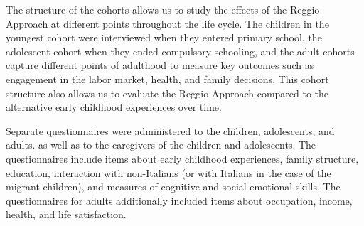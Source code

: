 %	

The structure of the cohorts allows us to study the effects of the Reggio Approach at different points throughout the life cycle. The children in the youngest cohort were interviewed when they entered primary school, the adolescent cohort when they ended compulsory schooling, and the adult cohorts capture different points of adulthood to measure key outcomes such as engagement in the labor market, health, and family decisions. This cohort structure also allows us to evaluate the Reggio Approach compared to the alternative early childhood experiences over time.

Separate questionnaires were administered to the children, adolescents, and adults. as well as to the caregivers of the children and adolescents. The questionnaires include items about early childhood experiences, family structure, education, interaction with non-Italians (or with Italians in the case of the migrant children), and measures of cognitive and social-emotional skills. The questionnaires for adults additionally included items about occupation, income, health, and life satisfaction. 



